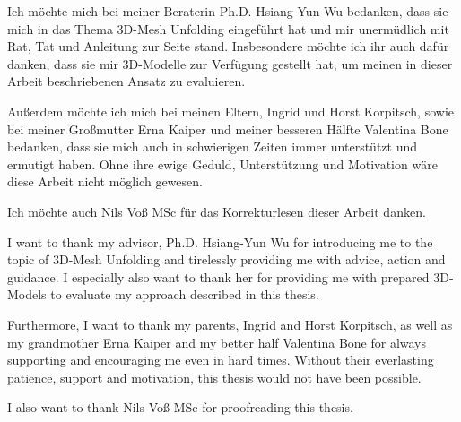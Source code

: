 \documentclass[draft,final]{vutinfth} %
\begin{document}
\frontmatter %

\addstatementpage

\begin{danksagung*}
Ich möchte mich bei meiner Beraterin Ph.D. Hsiang-Yun Wu bedanken, dass sie mich in das Thema 3D-Mesh Unfolding eingeführt hat und mir unermüdlich mit Rat, Tat und Anleitung zur Seite stand. Insbesondere möchte ich ihr auch dafür danken, dass sie mir 3D-Modelle zur Verfügung gestellt hat, um meinen in dieser Arbeit beschriebenen Ansatz zu evaluieren. 

Außerdem möchte ich mich bei meinen Eltern, Ingrid und Horst Korpitsch, sowie bei meiner Großmutter Erna Kaiper und meiner besseren Hälfte Valentina Bone bedanken, dass sie mich auch in schwierigen Zeiten immer unterstützt und ermutigt haben. Ohne ihre ewige Geduld, Unterstützung und Motivation wäre diese Arbeit nicht möglich gewesen.

Ich möchte auch Nils Voß MSc für das Korrekturlesen dieser Arbeit danken.
\end{danksagung*}

\begin{acknowledgements*}
I want to thank my advisor, Ph.D. Hsiang-Yun Wu for introducing me to the topic of 3D-Mesh Unfolding and tirelessly providing me with advice, action and guidance. I especially also want to thank her for providing me with prepared 3D-Models to evaluate my approach described in this thesis. 

Furthermore, I want to thank my parents, Ingrid and Horst Korpitsch, as well as my grandmother Erna Kaiper and my better half Valentina Bone for always supporting and encouraging me even in hard times. Without their everlasting patience, support and motivation, this thesis would not have been possible.

I also want to thank Nils Voß MSc for proofreading this thesis.
\end{acknowledgements*}
\end{document}
